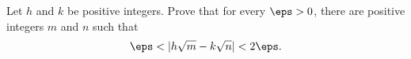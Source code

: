 Let $h$ and $k$ be positive integers. Prove that for every $\eps>0$, there are positive integers $m$ and $n$ such that
\[
	\eps < |h\sqrt{m}-k\sqrt{n}| < 2\eps.
\]